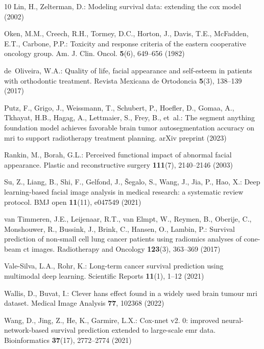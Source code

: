 \documentclass[runningheads]{llncs}
\begin{document}
\begin{thebibliography}{10}
Lin, H., Zelterman, D.: Modeling survival data: extending the cox model (2002)

Oken, M.M., Creech, R.H., Tormey, D.C., Horton, J., Davis, T.E., McFadden,
  E.T., Carbone, P.P.: Toxicity and response criteria of the eastern
  cooperative oncology group. Am. J. Clin. Oncol.  \textbf{5}(6),  649--656
  (1982)

de~Oliveira, W.A.: Quality of life, facial appearance and self-esteem in
  patients with orthodontic treatment. Revista Mexicana de Ortodoncia
  \textbf{5}(3),  138--139 (2017)

Putz, F., Grigo, J., Weissmann, T., Schubert, P., Hoefler, D., Gomaa, A.,
  Tkhayat, H.B., Hagag, A., Lettmaier, S., Frey, B., et~al.: The segment
  anything foundation model achieves favorable brain tumor autosegmentation
  accuracy on mri to support radiotherapy treatment planning. arXiv preprint
  (2023)

Rankin, M., Borah, G.L.: Perceived functional impact of abnormal facial
  appearance. Plastic and reconstructive surgery  \textbf{111}(7),  2140--2146
  (2003)

Su, Z., Liang, B., Shi, F., Gelfond, J., {\v{S}}egalo, S., Wang, J., Jia, P.,
  Hao, X.: Deep learning-based facial image analysis in medical research: a
  systematic review protocol. BMJ open  \textbf{11}(11),  e047549 (2021)

van Timmeren, J.E., Leijenaar, R.T., van Elmpt, W., Reymen, B., Oberije, C.,
  Monshouwer, R., Bussink, J., Brink, C., Hansen, O., Lambin, P.: Survival
  prediction of non-small cell lung cancer patients using radiomics analyses of
  cone-beam ct images. Radiotherapy and Oncology  \textbf{123}(3),  363--369
  (2017)

Vale-Silva, L.A., Rohr, K.: Long-term cancer survival prediction using
  multimodal deep learning. Scientific Reports  \textbf{11}(1),  1--12 (2021)

Wallis, D., Buvat, I.: Clever hans effect found in a widely used brain tumour
  mri dataset. Medical Image Analysis  \textbf{77},  102368 (2022)

Wang, D., Jing, Z., He, K., Garmire, L.X.: Cox-nnet v2. 0: improved
  neural-network-based survival prediction extended to large-scale emr data.
  Bioinformatics  \textbf{37}(17),  2772--2774 (2021)


\end{thebibliography}
\end{document}
